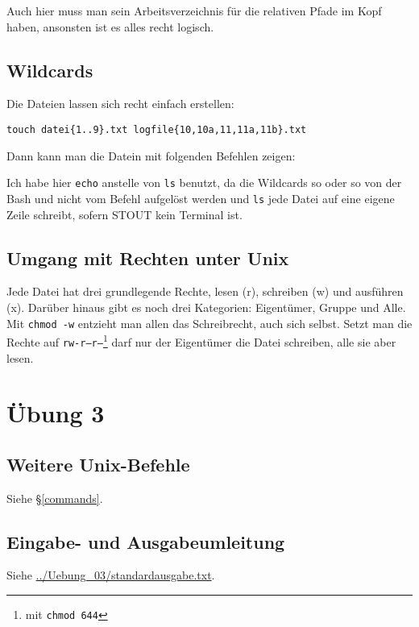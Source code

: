 \documentclass[10pt]{article}
\begin{document}
Auch hier muss man sein Arbeitsverzeichnis für die relativen Pfade im Kopf haben, ansonsten ist es alles recht logisch.

\subsection{Wildcards}

Die Dateien lassen sich recht einfach erstellen:
\begin{lstlisting}
touch datei{1..9}.txt logfile{10,10a,11,11a,11b}.txt
\end{lstlisting}

Dann kann man die Datein mit folgenden Befehlen zeigen:



Ich habe hier \texttt{echo} anstelle von \texttt{ls} benutzt, da die Wildcards so oder so von der Bash und nicht vom Befehl aufgelöst werden und \texttt{ls} jede Datei auf eine eigene Zeile schreibt, sofern STOUT kein Terminal ist.

\subsection{Umgang mit Rechten unter Unix}

Jede Datei hat drei grundlegende Rechte, lesen (r), schreiben (w) und ausführen (x). Darüber hinaus gibt es noch drei Kategorien: Eigentümer, Gruppe und Alle. Mit \texttt{chmod -w} entzieht man allen das Schreibrecht, auch sich selbst. Setzt man die Rechte auf \texttt{rw-r--r--}\footnote{mit \texttt{chmod 644}} darf nur der Eigentümer die Datei schreiben, alle sie aber lesen.

\section{Übung 3}

\subsection{Weitere Unix-Befehle}

Siehe §\ref{commands}.

\subsection{Eingabe- und Ausgabeumleitung}

Siehe \url{../Uebung_03/standardausgabe.txt}.
\end{document}
